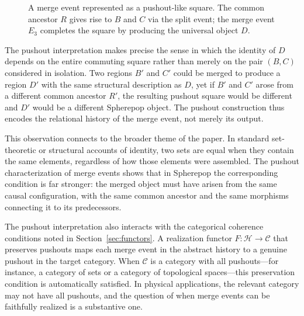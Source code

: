 \documentclass[12pt]{article}
\theoremstyle{plain}
\theoremstyle{definition}
\theoremstyle{remark}
\begin{document}
\begin{figure}[ht]
\centering
{}
\caption{A merge event represented as a pushout-like square.  The common ancestor $R$
gives rise to $B$ and $C$ via the split event; the merge event $E_3$ completes
the square by producing the universal object $D$.}
\label{fig:pushout}
\end{figure}

The pushout interpretation makes precise the sense in which the identity of
$D$ depends on the entire commuting square rather than merely on the pair
$(B, C)$ considered in isolation.  Two regions $B'$ and $C'$ could be merged
to produce a region $D'$ with the same structural description as $D$, yet if
$B'$ and $C'$ arose from a different common ancestor $R'$, the resulting
pushout square would be different and $D'$ would be a different Spherepop
object.  The pushout construction thus encodes the relational history of the
merge event, not merely its output.

This observation connects to the broader theme of the paper.  In standard
set-theoretic or structural accounts of identity, two sets are equal when they
contain the same elements, regardless of how those elements were assembled.
The pushout characterization of merge events shows that in Spherepop the
corresponding condition is far stronger: the merged object must have arisen
from the same causal configuration, with the same common ancestor and the same
morphisms connecting it to its predecessors.

The pushout interpretation also interacts with the categorical coherence
conditions noted in Section~\ref{sec:functors}.  A realization functor
$F : \mathcal{H} \rightarrow \mathcal{C}$ that preserves pushouts maps each
merge event in the abstract history to a genuine pushout in the target
category.  When $\mathcal{C}$ is a category with all pushouts---for instance,
a category of sets or a category of topological spaces---this preservation
condition is automatically satisfied.  In physical applications, the relevant
category may not have all pushouts, and the question of when merge events can
be faithfully realized is a substantive one.
\end{document}
